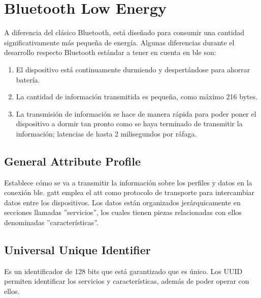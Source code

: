 \section{Bluetooth Low Energy}\label{apendice:ble}
A diferencia del clásico Bluetooth, está diseñado para
consumir una cantidad significativamente más pequeña de energía. Algunas
diferencias durante el desarrollo respecto Bluetooth estándar a tener en cuenta
en \gls{ble} son:
\begin{enumerate}
	\item El dispositivo está continuamente durmiendo y despertándose para
	ahorrar batería.
	\item La cantidad de información transmitida es pequeña, como máximo 216
	bytes.
	\item La transmisión de información se hace de manera rápida para poder poner
	el dispositivo a dormir tan pronto como se haya terminado de transmitir la
	información; latencias de hasta	2 milisegundos por ráfaga.
\end{enumerate}

\subsection{General Attribute Profile}
Establece cómo se va a transmitir la información sobre los perfiles y datos en
la conexión \gls{ble}. \gls{gatt} emplea el \gls{att} como protocolo de
transporte para intercambiar datos entre los dispositivos. Los datos están
organizados jerárquicamente en secciones llamadas ''servicios'', los cuales
tienen piezas relacionadas con ellos denominadas ''características''.

\subsection{Universal Unique Identifier}
Es un identificador de 128 bits que está garantizado que es único. Los UUID
permiten identificar los servicios y características, además de poder operar
con ellos.
